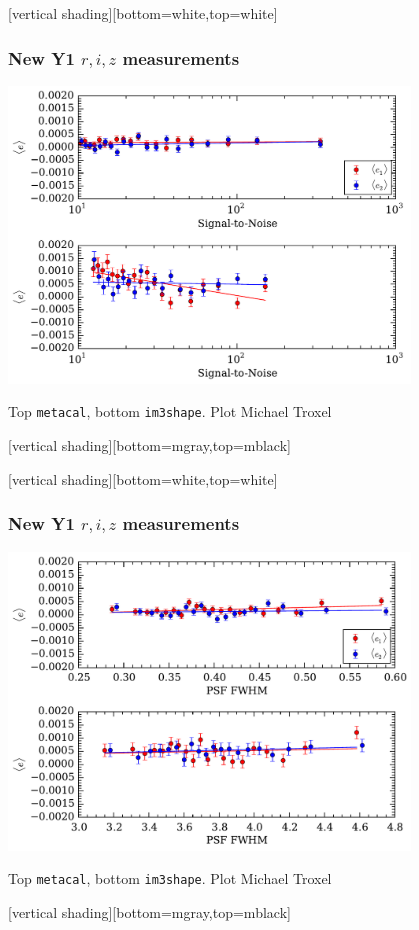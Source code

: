 \documentclass{beamer}
\begin{document}
{

    [vertical shading][bottom=white,top=white]
    \frame
    {
        \frametitle{New Y1 $r,i,z$ measurements}

                \begin{center}
                    \includegraphics[width=0.8\textwidth]{lin_split_snr.pdf}
                \end{center}

        \vspace{5mm}
        Top \texttt{metacal}, bottom \texttt{im3shape}. Plot Michael Troxel


    }
    [vertical shading][bottom=mgray,top=mblack]
}
{
    [vertical shading][bottom=white,top=white]
    \frame
    {
        \frametitle{New Y1 $r,i,z$ measurements}

                \begin{center}
                    \includegraphics[width=0.8\textwidth]{lin_split_psfsize.pdf}
                \end{center}

        \vspace{5mm}
        Top \texttt{metacal}, bottom \texttt{im3shape}. Plot Michael Troxel


    }
    [vertical shading][bottom=mgray,top=mblack]
}
\end{document}
